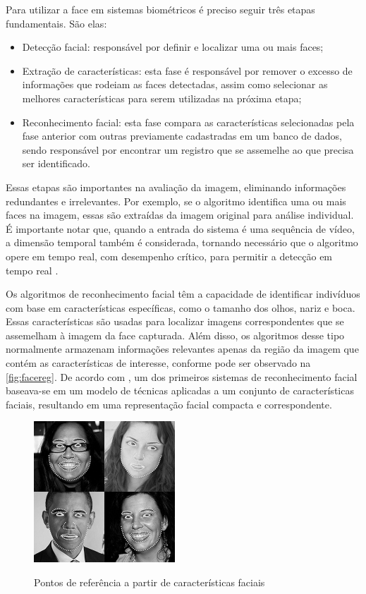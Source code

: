 Para utilizar a face em sistemas biométricos é preciso seguir três
etapas fundamentais. São elas:

\begin{itemize}
    \item Detecção facial: responsável por definir e localizar uma ou mais
    faces;

    \item Extração de características: esta fase é responsável por remover o excesso de
    informações que rodeiam as faces detectadas, assim como selecionar as melhores
    características para serem utilizadas na próxima etapa;

    \item Reconhecimento facial: esta fase compara as características selecionadas pela fase
    anterior com outras previamente cadastradas em um banco de dados, sendo
    responsável por encontrar um registro que se assemelhe ao que precisa ser
    identificado.

\end{itemize}

Essas etapas são importantes na avaliação da imagem, eliminando informações 
redundantes e irrelevantes. Por exemplo, se o algoritmo identifica uma ou mais faces na 
imagem, essas são extraídas da imagem original para análise individual. É importante 
notar que, quando a entrada do sistema é uma sequência de vídeo, a dimensão temporal 
também é considerada, tornando necessário que o algoritmo opere em tempo real, com 
desempenho crítico, para permitir a detecção em tempo real \cite{boechat2008}. 

Os algoritmos de reconhecimento facial têm a capacidade de identificar indivíduos com 
base em características específicas, como o tamanho dos olhos, nariz e boca. Essas 
características são usadas para localizar imagens correspondentes que se assemelham 
à imagem da face capturada. Além disso, os algoritmos desse tipo normalmente armazenam 
informações relevantes apenas da região da imagem que contém as características de 
interesse, conforme pode ser observado na \autoref{fig:facereg}. De acordo 
com \cite{brunelli1993}, um dos primeiros sistemas de reconhecimento 
facial baseava-se em um modelo de técnicas aplicadas a um conjunto de características 
faciais, resultando em uma representação facial compacta e correspondente.

\begin{figure}[h!]
    \centering
    \caption{Pontos de referência a partir de características faciais}
    \includegraphics[scale=0.9]{figuras/facereg.jpg}
    \label{fig:facereg}
    \centering
\end{figure}

